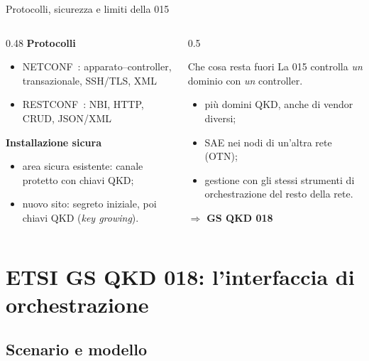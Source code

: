 \documentclass[10pt]{beamer}
\begin{document}
\begin{frame}{Protocolli, sicurezza e limiti della 015}
  \begin{columns}[T]
    \begin{column}{0.48\textwidth}
      \textbf{Protocolli}
      \begin{itemize}\small
        \item NETCONF~\cite{rfc6241}: apparato–controller, transazionale,
              SSH/TLS, XML
        \item RESTCONF~\cite{rfc8040}: NBI, HTTP, CRUD, JSON/XML
      \end{itemize}
      \textbf{Installazione sicura}
      \begin{itemize}\small
        \item area sicura esistente: canale protetto con chiavi QKD;
        \item nuovo sito: segreto iniziale, poi chiavi QKD
              (\emph{key growing}).
      \end{itemize}
    \end{column}
    \begin{column}{0.5\textwidth}
      \begin{alertblock}{Che cosa resta fuori}
        La 015 controlla \emph{un} dominio con \emph{un} controller.
        \begin{itemize}\small
          \item più domini QKD, anche di vendor diversi;
          \item SAE nei nodi di un'altra rete (OTN);
          \item gestione con gli stessi strumenti di orchestrazione
                del resto della rete.
        \end{itemize}
      \end{alertblock}
      \centering$\Rightarrow$ \textbf{GS QKD 018}
    \end{column}
  \end{columns}
\end{frame}

\section[GS QKD 018]{ETSI GS QKD 018: l'interfaccia di orchestrazione}

\subsection{Scenario e modello}
\end{document}
